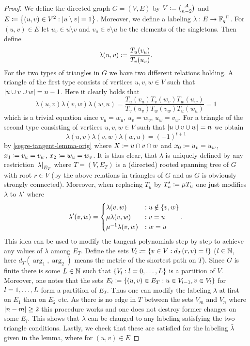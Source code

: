 \begin{proof}
    We define the directed graph $G=(V,E)$ by $V\defeq \binom{\cA}{n-2}$ and $E\defeq \set{(u,v)\in V^2:\card{u\setminus v}=1}$.
    Moreover, we define a labeling $\lambda:E\to \units{\field{q}}$. For $(u,v)\in E$ let $u_v\in u\setminus v$ and $v_u\in v\setminus u$ be the elements of the singletons. Then define
    $$
    \lambda(u,v)\mathrel{\mathrel{\mathop:}\mkern-1.2mu=} \frac{T_u(v_u)}{T_v(u_v)}\text{.} 
    $$
    For the two types of triangles in $G$ we have two different relations holding.
    A triangle of the first type consists of vertices $u,v,w\in V$ such that $\left\vert{u\cup v\cup w}\right\vert=n-1$.
    Here it clearly holds that
    $$
    \lambda(u,v)\lambda(v,w)\lambda(w,u)=\frac{T_u(v_u)T_v(w_v)T_w(u_w)}{T_v(u_v)T_w(v_w)T_u(w_u)}=1
    $$
    which is a trivial equation since $v_u=w_u$, $u_v=w_v$, $u_w=v_w$.
    For a triangle of the second type consisting of vertices $u,v,w\in V$ such that $\left\vert{u\cup v\cup w}\right\vert=n$ we obtain
    $$
    \lambda(u,v)\lambda(v,w)\lambda(w,u)={(-1)}^{t+1}
    $$
    by \autoref{segre-tangent-lemma-orig} where $X\mathrel{\mathrel{\mathop:}\mkern-1.2mu=} u\cap v\cap w$ and $x_0\mathrel{\mathrel{\mathop:}\mkern-1.2mu=} u_v=u_w$, $x_1\mathrel{\mathrel{\mathop:}\mkern-1.2mu=} v_u=v_w$, $x_2\mathrel{\mathrel{\mathop:}\mkern-1.2mu=} w_u=w_v$.
    It is thus clear, that $\lambda$ is uniquely defined by any restriction $\left. \lambda\right\vert_{E_T}$ where $T=(V,E_T)$ is a (directed) rooted spanning tree of $G$ with root $r\in V$ (by the above relations in triangles of $G$ and as $G$ is obviously strongly connected).
    Moreover, when replacing $T_u$ by $T'_u\mathrel{\mathrel{\mathop:}\mkern-1.2mu=} \mu T_u$ one just modifies $\lambda$ to $\lambda'$ where 
    $$
    \lambda'(v,w)=
    \begin{cases} 
        \lambda(v,w) & : u\notin\set{v,w}\\
        \mu\lambda(v,w) &: v=u\\
        \mu^{-1}\lambda(v,w) &: w=u
    \end{cases}\text{.}
    $$
    This idea can be used to modify the tangent polynomials step by step to achieve any values of $\lambda$ among $E_T$.
    Define the sets $V_l\defeq \set{v\in V}[d_T(r,v)=l]$ ($l\in\mathbb{N}$, here $d_T(\arg_1,\arg_2)$ means the metric of the shortest path on $T$). Since $G$ is finite there is some $L\in\mathbb{N}$ such that $\set{V_l}[l=\range 0 L]$ is a partition of $V$. Moreover, one notes that the sets $E_l\defeq \set{(u,v)\in E_T}[u\in V_{l-1},v\in V_l]$ for $l=\range 1 L$ form a partition of $E_T$. Thus one can modify the labeling $\lambda$ at first on $E_1$ then on $E_2$ etc. As there is no edge in $T$ between the sets $V_m$ and $V_n$ where $\left\vert{n-m}\right\vert\geq 2$ this procedure works and one does not destroy former changes on some $E_i$. 
    This shows that $\lambda$ can be changed to any labeling satisfying the two triangle conditions.
    Lastly, we check that these are satisfied for the labeling $\bar{\lambda}$ given in the lemma, where for $(u,v)\in E$


\end{proof}
